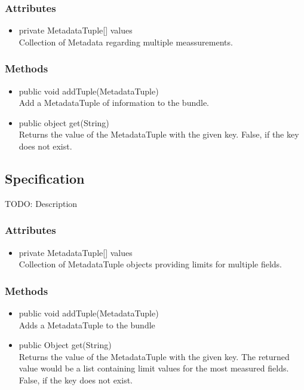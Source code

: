 \subsubsection{Attributes}
\begin{itemize}
	\item private  MetadataTuple[] values\\
	Collection of Metadata regarding multiple meassurements.
\end{itemize}
\subsubsection{Methods}
\begin{itemize}
	\item public  void addTuple(MetadataTuple)\\
	Add a MetadataTuple of information to the bundle.
	\item public  object get(String)\\
	Returns the value of the MetadataTuple with the given key. False, if the key does not exist.
\end{itemize}


\subsection{Specification}
TODO: Description

\subsubsection{Attributes}
\begin{itemize}
	\item private  MetadataTuple[] values\\
	Collection of MetadataTuple objects providing limits for multiple fields.
\end{itemize}
\subsubsection{Methods}
\begin{itemize}
	\item public  void addTuple(MetadataTuple)\\
	Adds a MetadataTuple to the bundle
	\item public  Object get(String)\\
	Returns the value of the MetadataTuple with the given key. The returned value would be a list containing limit values for the most measured fields. False, if the key does not exist.
\end{itemize}


